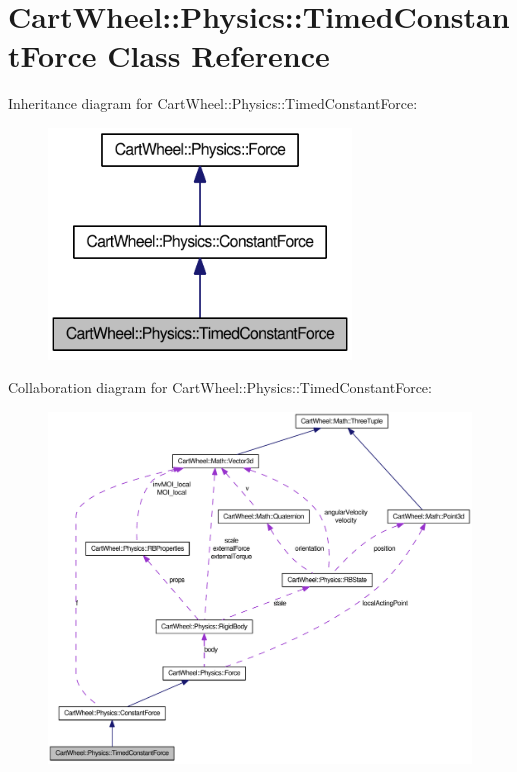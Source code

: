 \hypertarget{classCartWheel_1_1Physics_1_1TimedConstantForce}{
\section{CartWheel::Physics::TimedConstantForce Class Reference}
\label{classCartWheel_1_1Physics_1_1TimedConstantForce}
}


Inheritance diagram for CartWheel::Physics::TimedConstantForce:\nopagebreak
\begin{figure}[H]
\begin{center}
\leavevmode
\includegraphics[width=228pt]{classCartWheel_1_1Physics_1_1TimedConstantForce__inherit__graph}
\end{center}
\end{figure}


Collaboration diagram for CartWheel::Physics::TimedConstantForce:\nopagebreak
\begin{figure}[H]
\begin{center}
\leavevmode
\includegraphics[width=400pt]{classCartWheel_1_1Physics_1_1TimedConstantForce__coll__graph}
\end{center}
\end{figure}

